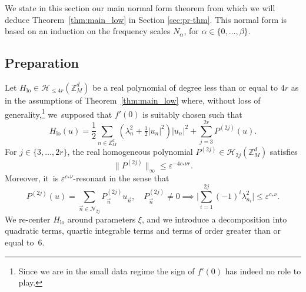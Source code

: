\documentclass[JEP,XML,SOM,Unicode,published]{cedram}
\theoremstyle{plain}
\theoremstyle{definition}
\DeclareMathOperator{\lo}{lo}
\newcommand{\Z}{\mathbb{Z}}
\newcommand{\1}{\mathbf{1}}
\let\epsilon\varepsilon
\begin{document}
We state in this section our main normal form theorem from which we will deduce Theorem~\ref{thm:main_low} in Section \ref{sec:pr-thm}. This normal form is based on an induction on the frequency scales $N_{\alpha}$, for $\alpha\in\{0,\dots,\beta\}$.

\subsection{Preparation} \label{sec:init}
Let $H_{\lo}\in\mathcal{H}_{\leq4r}(\Z_{M}^{d})$ be a real polynomial of degree less than or equal to $4r$ as in the assumptions of Theorem~\ref{thm:main_low} where, without loss of generality,\footnote{Since we are in the small data regime the sign of $f'(0)$ has indeed no role to play.} we~supposed that $f'(0)$ is suitably chosen such that
\begin{equation}
\label{eq:mars}
H_{\lo}(u) = \frac{1}{2}\sum_{n\in\Z_{M}^{d}} (\lambda_{n}^{2}+ \tfrac{1}{2}|u_{n}|^{2}) |u_{n}|^{2} + \sum_{j=3}^{2r}P^{(2j)}(u).
\end{equation}
For $j\in\{3,\dots,2r\}$, the real homogeneous polynomial $P^{(2j)}\in\mathcal{H}_{2j}(\Z_{M}^{d})$ satisfies
\begin{equation}
\label{eq:froid}
\|P^{(2j)}\|_{\infty} \leq \epsilon^{-4c_{\ast}\nu r}.
\end{equation}
Moreover, it~is $\epsilon^{c_{\ast}\nu}$-resonant in the sense that
\[
P^{(2j)}(u)
=
\sum_{\vec{n}\in\mathcal{N}_{2j}}
P^{(2j)}_{\vec{n}}u_{\vec{n}},
\quad P^{(2j)}_{\vec{n}}\neq0
\implies
\biggl|\sum_{i=1}^{2j}(-1)^{i}\lambda_{n_{i}}^{2}\biggl| \leq \epsilon^{c_{\ast}\nu}.
\]
We re-center $H_{\lo}$ around parameters $\xi$, and we introduce a decomposition into quadratic terms, quartic integrable terms and terms of order greater than or equal to~6.
\end{document}
